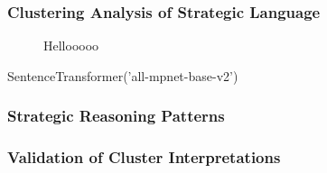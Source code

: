 \subsubsection*{Clustering Analysis of Strategic Language}

\begin{figure}[htpb!]
    \centering
    
    \caption{Hellooooo}
    \label{fig:relative_prevalence_clusters}
\end{figure}

SentenceTransformer('all-mpnet-base-v2')



\subsubsection*{Strategic Reasoning Patterns}


\subsubsection*{Validation of Cluster Interpretations}





